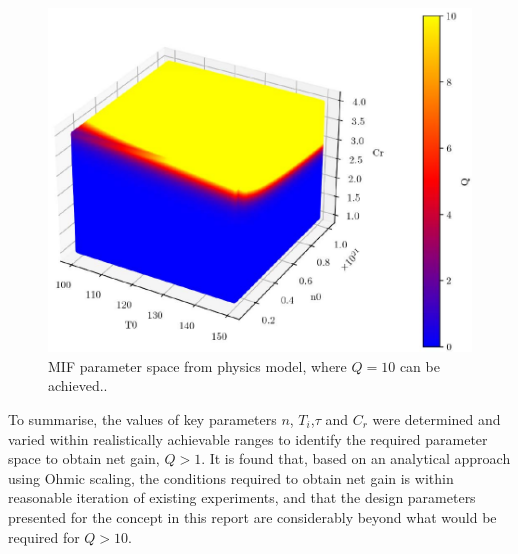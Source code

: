 \begin{figure}[h!] 
\centering
\includegraphics[scale=0.5]{SubreportFigures/Q_n0_T0_Cr_10_3d.pdf}
\caption{MIF parameter space from physics model, where $Q = 10$ can be achieved..}
\label{fig:model_3d_10}
\end{figure}

To summarise, the values of key parameters $n$, $T_i$,$\tau$ and $C_r$ were determined and varied within realistically achievable ranges to identify the required parameter space to obtain net gain, $Q > 1$. It is found that, based on an analytical approach using Ohmic scaling, the conditions required to obtain net gain is within reasonable iteration of existing experiments, and that the design parameters presented for the concept in this report are considerably beyond what would be required for $Q > 10$.